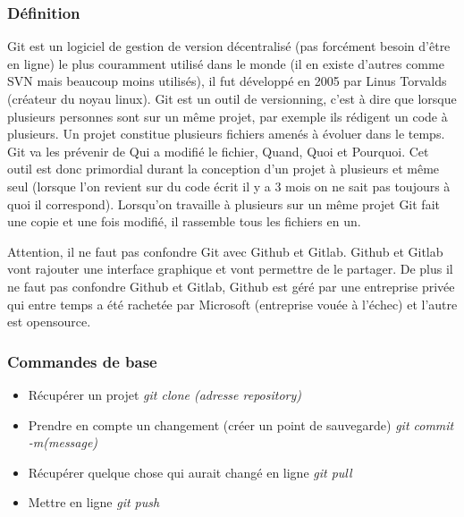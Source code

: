 \subsubsection{Définition}
Git est un logiciel de gestion de version décentralisé (pas forcément besoin d'être en ligne) le plus couramment utilisé dans le monde
(il en existe d'autres comme SVN mais beaucoup moins utilisés), il fut développé en 2005 par Linus Torvalds (créateur du noyau linux).
Git est un outil de versionning, c'est à dire que lorsque plusieurs personnes sont sur un même projet, par exemple ils rédigent un code à plusieurs.
 Un projet constitue plusieurs fichiers amenés à évoluer dans le temps. Git va les prévenir de Qui a modifié le fichier, Quand, Quoi et Pourquoi.
 Cet outil est donc primordial durant la conception d'un projet à plusieurs et même seul
 (lorsque l'on revient sur du code écrit il y a 3 mois on ne sait pas toujours à quoi il correspond).
 Lorsqu'on travaille à plusieurs sur un même projet Git fait une copie et une fois modifié, il rassemble tous les fichiers en un.

Attention, il ne faut pas confondre Git avec Github et Gitlab. Github et Gitlab vont rajouter une interface graphique et vont permettre
 de le partager. De plus il ne faut pas confondre Github et Gitlab, Github est géré par une entreprise privée qui entre temps a été
 rachetée par Microsoft (entreprise vouée à l'échec) et l'autre est opensource.

\subsubsection{Commandes de base}
\begin{itemize}
	\item Récupérer un projet \textit{git clone (adresse repository)}
	\item Prendre en compte un changement (créer un point de sauvegarde) \textit{git commit -m(message)}
	\item Récupérer quelque chose qui aurait changé en ligne \textit{git pull}
	\item Mettre en ligne \textit{git push}
\end{itemize}
